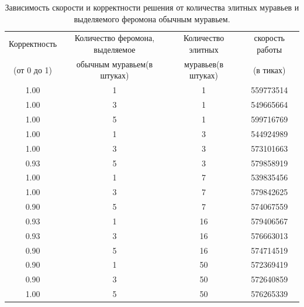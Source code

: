 \documentclass[12pt, a4paper]{report}
\begin{document}
    		\newpage
    		\begin{table}[ht!]
    			\center
    			\begin{tabular}{ | c | c | c | c | }
    				\hline
    				Корректность   &  Количество феромона, выделяемое   &  Количество элитных  &  скорость работы \\
    				(от 0 до 1) & обычным муравьем(в штуках) & муравьев(в штуках) & (в тиках) \\ \hline  
    				1.00 &   1 &   1 &  559773514 \\
    				1.00 &   3 &   1 &  549665664 \\
    				1.00 &   5 &   1 &  599716769 \\
    				1.00 &   1 &   3 &  544924989 \\
    				1.00 &   3 &   3 &  573101663 \\
    				0.93 &   5 &   3 &  579858919 \\
    				1.00 &   1 &   7 &  539835456 \\
    				1.00 &   3 &   7 &  579842625 \\
    				0.90 &   5 &   7 &  574067559 \\
    				0.93 &   1 &  16 &  579406567 \\
    				0.93 &   3 &  16 &  576663013 \\
    				0.90 &   5 &  16 &  574714519 \\
    				0.90 &   1 &  50 &  572369419 \\
    				0.90 &   3 &  50 &  572640859 \\
    				1.00 &   5 &  50 &  576265339 \\
    				\hline
    			\end{tabular}
    			\label{tab:ants_elite}
    			\caption{Зависимость скорости и корректности решения от количества элитных муравьев и выделяемого феромона обычным муравьем.}
    		\end{table} 
    		
\end{document}
